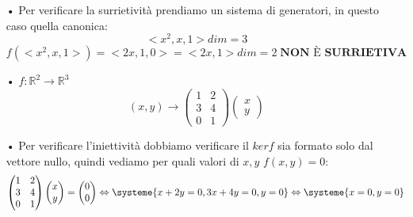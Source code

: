 \begin{itemize}
\subitem •  Per verificare la surrietività prendiamo un sistema di generatori, in questo caso quella canonica:
$$ <x^2,x,1> dim=3$$
$$ f(<x^2,x,1>) = <2x,1,0> = <2x,1> dim = 2 \; \textbf{NON È SURRIETIVA}$$

\item[•] $f: \mathbb{R}^2 \rightarrow \mathbb{R}^3 $
$$ (x,y) \rightarrow \begin{pmatrix} 1&2\\3&4\\0&1 \end{pmatrix} \begin{pmatrix} x \\ y \end{pmatrix} $$

\subitem •  Per verificare l'iniettività dobbiamo verificare il $ker f$ sia formato solo dal vettore nullo, quindi vediamo per quali valori di $x,y$ $f(x,y) = 0$:
$$ \begin{pmatrix} 1&2\\3&4\\0&1 \end{pmatrix} \begin{pmatrix} x \\ y \end{pmatrix} = \begin{pmatrix} 0 \\ 0 \end{pmatrix}  \Leftrightarrow \systeme{x+2y=0, 3x+4y=0, y=0} \Leftrightarrow \systeme{x=0,y=0} $$

\end{itemize}

